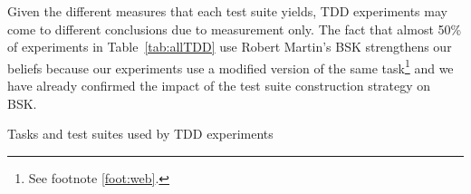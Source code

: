 Given the different measures that each test suite yields, TDD experiments may come to different conclusions due to measurement only. The fact that almost 50\% of experiments in Table~\ref{tab:allTDD} use Robert Martin's BSK strengthens our beliefs because our experiments use a modified version of the same task\footnote{See footnote \ref{foot:web}.} and we have already confirmed the impact of the test suite construction strategy on BSK. 

\begin{table*}[htbp]
\centering
\caption{Tasks and test suites used by TDD experiments}
\label{tab:allTDD}
\resizebox{\textwidth}{!}{%
    
}
\end{table*}

